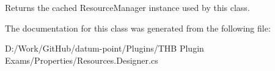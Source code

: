 Returns the cached Resource\+Manager instance used by this class. 



The documentation for this class was generated from the following file\+:\begin{DoxyCompactItemize}
\item 
D\+:/\+Work/\+Git\+Hub/datum-\/point/\+Plugins/\+T\+H\+B Plugin Exams/\+Properties/Resources.\+Designer.\+cs\end{DoxyCompactItemize}
